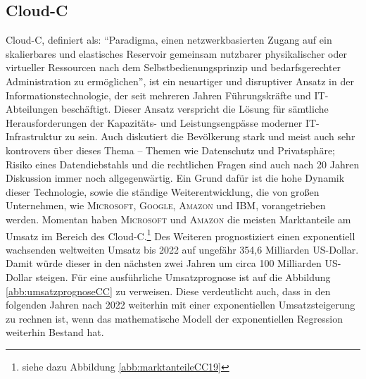 \subsection{\ac{Cloud-C}}
\ac{Cloud-C}, definiert als: \enquote{Paradigma, einen netzwerkbasierten Zugang auf ein skalierbares und  elastisches Reservoir gemeinsam nutzbarer physikalischer oder virtueller Ressourcen nach dem Selbstbedienungsprinzip und bedarfsgerechter Administration zu ermöglichen}\autocite[][S.\,7]{dindeutsches_institut_fur_normung_informationstechnik_2020-2}, ist ein neuartiger und disruptiver Ansatz in der Informationstechnologie, der seit mehreren Jahren Führungskräfte und IT-Abteilungen beschäftigt. Dieser Ansatz verspricht die Lösung für sämtliche Herausforderungen der Kapazitäts- und Leistungsengpässe moderner IT-Infrastruktur zu sein.\autocite[vgl.][S.\,4]{reinheimer_cloud_2018} Auch diskutiert die Bevölkerung stark und meist auch sehr kontrovers über dieses Thema -- Themen wie Datenschutz und Privatsphäre; Risiko eines Datendiebstahls und die rechtlichen Fragen sind auch nach 20 Jahren Diskussion immer noch allgegenwärtig. Ein Grund dafür ist die hohe Dynamik dieser Technologie, sowie die ständige Weiterentwicklung, die von großen Unternehmen, wie \textsc{Microsoft}, \textsc{Google}, \textsc{Amazon} und \textsc{IBM}, vorangetrieben werden. Momentan haben \textsc{Microsoft} und \textsc{Amazon} die meisten Marktanteile am Umsatz im Bereich des \ac{Cloud-C}.\footnote{siehe dazu Abbildung \vref{abb:marktanteileCC19}} Des Weiteren prognostiziert \cite{gartner_cloud_2019} einen exponentiell wachsenden weltweiten Umsatz bis 2022 auf ungefähr 354,6 Milliarden US-Dollar. Damit würde dieser in den nächsten zwei Jahren um circa 100 Milliarden US-Dollar steigen. Für eine ausführliche Umsatzprognose ist auf die Abbildung \vref{abb:umsatzprognoseCC} zu verweisen. Diese verdeutlicht auch, dass in den folgenden Jahren nach 2022 weiterhin mit einer exponentiellen Umsatzsteigerung zu rechnen ist, wenn das mathematische Modell der exponentiellen Regression weiterhin Bestand hat. 
\par
